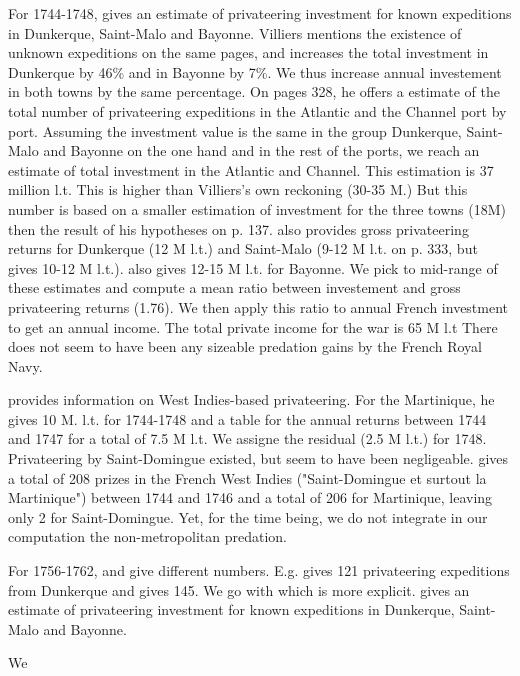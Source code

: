 \documentclass[12pt,a4paper,notitlepage,english]{article}
\begin{document}
\begin{appendix}
For 1744-1748, \cite[p. 327]{Villiers2002} gives an estimate of privateering investment for known expeditions in Dunkerque, Saint-Malo and Bayonne.
Villiers mentions the existence of unknown expeditions on the same pages, and increases the total investment in Dunkerque by 46\% and in Bayonne by 7\%.
We thus increase annual investement in both towns by the same percentage.
On pages 328, he offers a estimate of the total number of privateering expeditions in the Atlantic and the Channel port by port.
Assuming the investment value is the same in the group Dunkerque, Saint-Malo and Bayonne on the one hand and in the rest of the ports, we  reach an estimate of total investment in the Atlantic and Channel.
This estimation is 37 million l.t.
This is higher than Villiers’s own reckoning (30-35 M.) But this number is based on a smaller estimation of investment for the three towns (18M) then the result of his hypotheses on p. 137.
\cite[p. 332]{Villiers2002} also provides gross privateering returns for Dunkerque (12 M l.t.) and Saint-Malo (9-12 M l.t. on p. 333, but \cite[p. 43]{Villiers2007} gives 10-12 M l.t.). 
\cite[p. 43]{Villiers2007} also gives 12-15 M l.t. for Bayonne.
We pick to mid-range of these estimates and compute a mean ratio between investement and gross privateering returns (1.76).
We then apply this ratio to annual French investment to get an annual income.
The total private income for the war is 65 M l.t
There does not seem to have been any sizeable predation gains by the French Royal Navy.

\cite[p. 43]{Villiers2007} provides information on West Indies-based privateering.
For the Martinique, he gives 10 M. l.t. for 1744-1748 and a table for the annual returns between 1744 and 1747 for a total of 7.5 M l.t. 
We assigne the residual (2.5 M l.t.) for 1748.
Privateering by Saint-Domingue existed, but seem to have been negligeable.
\cite[p. 43]{Villiers2007} gives a total of 208 prizes in the French West Indies ("Saint-Domingue et surtout la Martinique") between 1744 and 1746 and a total of 206 for Martinique, leaving only 2 for Saint-Domingue.
Yet, for the time being, we do not integrate in our computation the non-metropolitan predation.

For 1756-1762, \cite{Villiers2002} and \cite{Villiers2007} give different numbers.
E.g. \cite[p.45]{Villiers2007} gives 121 privateering expeditions from Dunkerque and \cite[p. 35]{Villiers2002} gives 145.
We go with \cite{Villiers2002} which is more explicit.
\cite[p. 355]{Villiers2002} gives an estimate of privateering investment for known expeditions in Dunkerque, Saint-Malo and Bayonne.

We  




\end{appendix}

\tableofcontents

\listoftodos[Notes]
\end{document}
